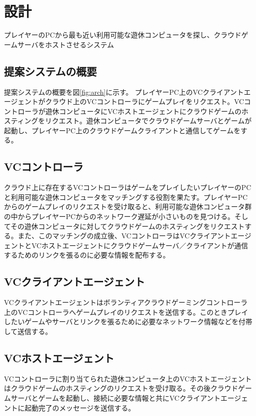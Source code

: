 \section{設計}

プレイヤーのPCから最も近い利用可能な遊休コンピュータを探し、クラウドゲームサーバをホストさせるシステム

\subsection{提案システムの概要}
提案システムの概要を図\ref{fig:arch}に示す。
プレイヤーPC上のVCクライアントエージェントがクラウド上のVCコントローラにゲームプレイをリクエスト。VCコントローラが遊休コンピュータにVCホストエージェントにクラウドゲームのホスティングをリクエスト。遊休コンピュータでクラウドゲームサーバとゲームが起動し、プレイヤーPC上のクラウドゲームクライアントと通信してゲームをする。

\subsection{VCコントローラ}
クラウド上に存在するVCコントローラはゲームをプレイしたいプレイヤーのPCと利用可能な遊休コンピュータをマッチングする役割を果たす。プレイヤーPCからのゲームプレイのリクエストを受け取ると、利用可能な遊休コンピュータ群の中からプレイヤーPCからのネットワーク遅延が小さいものを見つける。そしてその遊休コンピュータに対してクラウドゲームのホスティングをリクエストする。また、このマッチングの成立後、VCコントローラはVCクライアントエージェントとVCホストエージェントにクラウドゲームサーバ／クライアントが通信するためのリンクを張るのに必要な情報を配布する。

\subsection{VCクライアントエージェント}
VCクライアントエージェントはボランティアクラウドゲーミングコントローラ上のVCコントローラへゲームプレイのリクエストを送信する。このときプレイしたいゲームやサーバとリンクを張るために必要なネットワーク情報などを付帯して送信する。

\subsection{VCホストエージェント}
VCコントローラに割り当てられた遊休コンピュータ上のVCホストエージェントはクラウドゲームのホスティングのリクエストを受け取る。その後クラウドゲームサーバとゲームを起動し、接続に必要な情報と共にVCクライアントエージェントに起動完了のメッセージを送信する。

